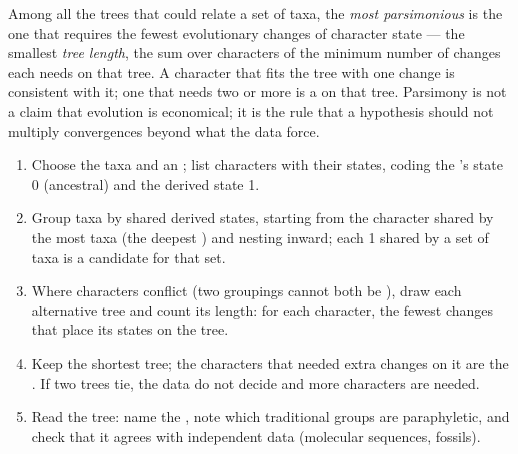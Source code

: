\begin{definition}[Parsimony]\label{def:b1:classifying-biodiversity:parsimony}
Among all the trees that could relate a set of taxa, the \emph{most
parsimonious} is the one that requires the fewest evolutionary
changes of character state --- the smallest \emph{tree length}, the
sum over characters of the minimum number of changes each needs on
that tree. A character that fits the tree with one change is
consistent with it; one that needs two or more is a  on
that tree. Parsimony is not a claim that evolution is economical; it
is the rule that a hypothesis should not multiply convergences
beyond what the data force.
\end{definition}

\begin{method}\label{met:b1:classifying-biodiversity:cladogram}
\begin{enumerate}
  \item Choose the taxa and an ; list characters with their
        states, coding the 's state 0 (ancestral) and the
        derived state 1.
  \item Group taxa by shared derived states, starting from the
        character shared by the most taxa (the deepest ) and
        nesting inward; each 1 shared by a set of taxa is a candidate
         for that set.
  \item Where characters conflict (two groupings cannot both be
        ), draw each alternative tree and count its length:
        for each character, the fewest changes that place its states
        on the tree.
  \item Keep the shortest tree; the characters that needed extra
        changes on it are the . If two trees tie, the
        data do not decide and more characters are needed.
  \item Read the tree: name the , note which traditional groups
        are paraphyletic, and check that it agrees with independent
        data (molecular sequences, fossils).
\end{enumerate}
\end{method}


